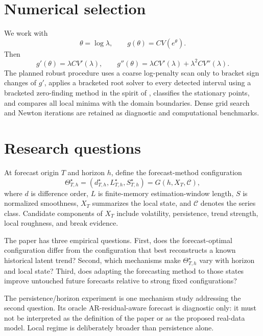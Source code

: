 \documentclass[11pt]{article}
\begin{document}
\section{Numerical selection}
We work with
\begin{equation}
\label{eq:log-lambda}
\theta=\log\lambda,
\qquad
g(\theta)=CV(e^\theta).
\end{equation}
Then
\begin{equation}
\label{eq:log-derivatives}
g'(\theta)=\lambda CV'(\lambda),
\qquad
g''(\theta)=\lambda CV'(\lambda)+\lambda^2CV''(\lambda).
\end{equation}
The planned robust procedure uses a coarse log-penalty scan only to bracket
sign changes of $g'$, applies a bracketed root solver to every detected
interval using a bracketed zero-finding method in the spirit of
\citet{brent1971zero}, classifies the stationary points, and compares all local
minima with the domain boundaries. Dense grid search and Newton iterations are
retained as diagnostic and computational benchmarks.

\section{Research questions}
At forecast origin \(T\) and horizon \(h\), define the forecast-method
configuration
\begin{equation}
\label{eq:adaptive-configuration}
\Theta^\star_{T,h}
=
\left(
d^\star_{T,h},
L^\star_{T,h},
S^\star_{T,h}
\right)
=
G\!\left(h,X_T,\mathcal C\right),
\end{equation}
where \(d\) is difference order, \(L\) is finite-memory estimation-window
length, \(S\) is normalized smoothness, \(X_T\) summarizes the local state, and
\(\mathcal C\) denotes the series class. Candidate components of \(X_T\)
include volatility, persistence, trend strength, local roughness, and break
evidence.

The paper has three empirical questions. First, does the forecast-optimal
configuration differ from the configuration that best reconstructs a known
historical latent trend? Second, which mechanisms make
\(\Theta^\star_{T,h}\) vary with horizon and local state? Third, does adapting
the forecasting method to those states improve untouched future forecasts
relative to strong fixed configurations?

The persistence/horizon experiment is one mechanism study addressing the
second question. Its oracle AR-residual-aware forecast is diagnostic only: it
must not be interpreted as the definition of the paper or as the proposed
real-data model. Local regime is deliberately broader than persistence alone.
\end{document}
